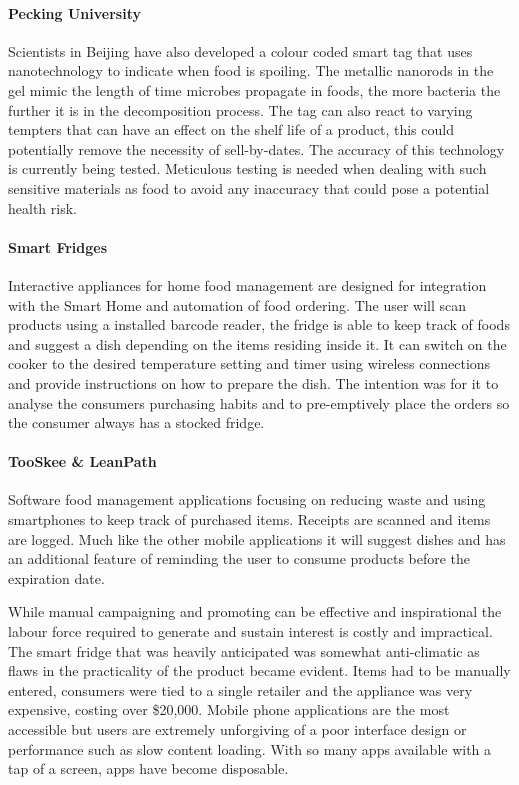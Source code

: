 \documentclass[a4paper, 11pt]{article}
\begin{document}
\paragraph{Pecking University}Scientists in Beijing have also developed a colour coded smart tag that uses nanotechnology to indicate when food is spoiling. The metallic nanorods in the gel mimic the length of time microbes propagate in foods, the more bacteria the further it is in the decomposition process. The tag can also react to varying tempters that can have an effect on the shelf life of a product, this could potentially remove the necessity of sell-by-dates. The accuracy of this technology is currently being tested. Meticulous testing is needed when dealing with such sensitive materials as food to avoid any inaccuracy that could pose a potential health risk.

\paragraph{Smart Fridges} Interactive appliances for home food management are designed for integration with the Smart Home and automation of food ordering. The user will scan products using a installed barcode reader, the fridge is able to keep track of foods and suggest a dish depending on the items residing inside it. It can switch on the cooker to the desired temperature setting and timer using wireless connections and provide instructions on how to prepare the dish. The intention was for it to analyse the consumers purchasing habits and to pre-emptively place the orders so the consumer always has a stocked fridge. 

\paragraph{TooSkee \& LeanPath} Software food management applications focusing on reducing waste and using smartphones to keep track of purchased items. Receipts are scanned and items are logged. Much like the other mobile applications it will suggest dishes and has an additional feature of reminding the user to consume products before the expiration date.		

\vspace{\baselineskip}
While manual campaigning and promoting can be effective and inspirational the labour force required to generate and sustain interest is costly and impractical. The smart fridge that was heavily anticipated was somewhat anti-climatic as flaws in the practicality of the product became evident. Items had to be manually entered, consumers were tied to a single retailer and the appliance was very expensive, costing over \$20,000. Mobile phone applications are the most accessible but users are extremely unforgiving of a poor interface design or performance such as slow content loading. With so many apps available with a tap of a screen, apps have become disposable. 
\end{document}
